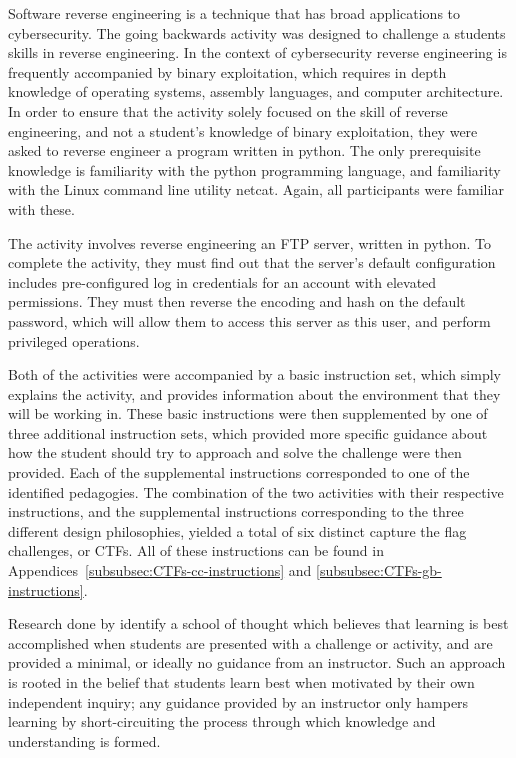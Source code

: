     Software reverse engineering is a technique that has broad applications to cybersecurity. %
The going backwards activity was designed to challenge a students skills in reverse engineering. %
In the context of cybersecurity reverse engineering is frequently accompanied by binary exploitation, which requires in depth knowledge of operating systems, assembly languages, and computer architecture. %
In order to ensure that the activity solely focused on the skill of reverse engineering, and not a student's knowledge of binary exploitation, they were asked to reverse engineer a program written in python. %
The only prerequisite knowledge is familiarity with the python programming language, and familiarity with the Linux command line utility netcat. %
Again, all participants were familiar with these.

    The activity involves reverse engineering an FTP server, written in python. %
To complete the activity, they must find out that the server's default configuration includes pre-configured log in credentials for an account with elevated permissions. %
They must then reverse the encoding and hash on the default password, which will allow them to access this server as this user, and perform privileged operations. 

    Both of the activities were accompanied by a basic instruction set, which simply explains the activity, and provides information about the environment that they will be working in. %
These basic instructions were then supplemented by one of three additional instruction sets, which provided more specific guidance about how the student should try to approach and solve the challenge were then provided. %
Each of the supplemental instructions corresponded to one of the identified pedagogies. %
The combination of the two activities with their respective instructions, and the supplemental instructions corresponding to the three different design philosophies, yielded a total of six distinct capture the flag challenges, or CTFs. %
All of these instructions can be found in Appendices~\ref{subsubsec:CTFs-cc-instructions} and \ref{subsubsec:CTFs-gb-instructions}.

        Research done by \textcite{J-Sweller,R-Weiss} identify a school of thought which believes that learning is best accomplished when students are presented with a challenge or activity, and are provided a minimal, or ideally no guidance from an instructor. %
Such an approach is rooted in the belief that students learn best when motivated by their own independent inquiry; %
any guidance provided by an instructor only hampers learning by short-circuiting the process through which knowledge and understanding is formed. 

